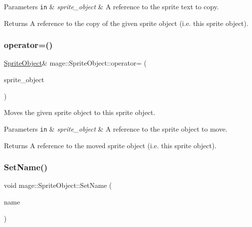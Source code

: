 \begin{DoxyParams}[1]{Parameters}
\mbox{\tt in}  & {\em sprite\+\_\+object} & A reference to the sprite text to copy. \\
\hline
\end{DoxyParams}
\begin{DoxyReturn}{Returns}
A reference to the copy of the given sprite object (i.\+e. this sprite object). 
\end{DoxyReturn}
\hypertarget{classmage_1_1_sprite_object_a0d098954e6ef5b331b2b7e6f6cb3c21e}{}\label{classmage_1_1_sprite_object_a0d098954e6ef5b331b2b7e6f6cb3c21e} 
\subsubsection{\texorpdfstring{operator=()}{operator=()}\hspace{0.1cm}{\footnotesize\ttfamily [2/2]}}
{\footnotesize\ttfamily \hyperlink{classmage_1_1_sprite_object}{Sprite\+Object}\& mage\+::\+Sprite\+Object\+::operator= (\begin{DoxyParamCaption}\item[{\hyperlink{classmage_1_1_sprite_object}{Sprite\+Object} \&\&}]{sprite\+\_\+object }\end{DoxyParamCaption})\hspace{0.3cm}{\ttfamily [delete]}}

Moves the given sprite object to this sprite object.


\begin{DoxyParams}[1]{Parameters}
\mbox{\tt in}  & {\em sprite\+\_\+object} & A reference to the sprite object to move. \\
\hline
\end{DoxyParams}
\begin{DoxyReturn}{Returns}
A reference to the moved sprite object (i.\+e. this sprite object). 
\end{DoxyReturn}
\hypertarget{classmage_1_1_sprite_object_a784cd7d61f3a9f71a521656ae3199366}{}\label{classmage_1_1_sprite_object_a784cd7d61f3a9f71a521656ae3199366} 
\subsubsection{\texorpdfstring{Set\+Name()}{SetName()}}
{\footnotesize\ttfamily void mage\+::\+Sprite\+Object\+::\+Set\+Name (\begin{DoxyParamCaption}\item[{const string \&}]{name }\end{DoxyParamCaption})}

